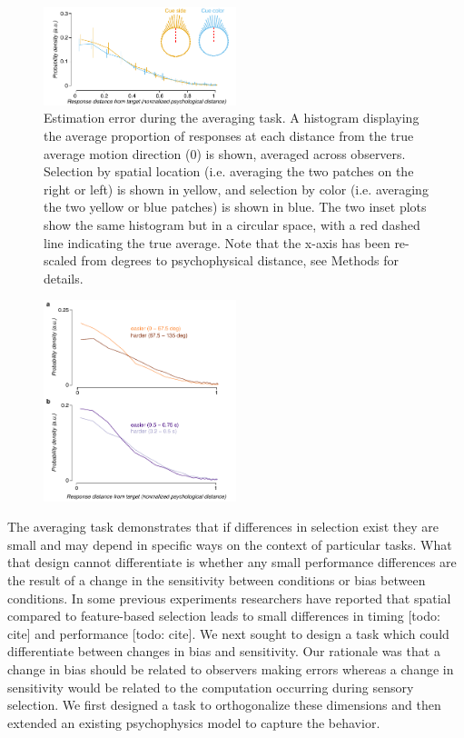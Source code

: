 \begin{figure}
\centering
\includegraphics[keepaspectratio,width=0.5\textwidth]{figs_c4/f2_aca_perf.pdf}
\caption[Estimation error during averaging]{Estimation error during the averaging task. A histogram displaying the average proportion of responses at each distance from the true average motion direction (0) is shown, averaged across observers. Selection by spatial location (i.e. averaging the two patches on the right or left) is shown in yellow, and selection by color (i.e. averaging the two yellow or blue patches) is shown in blue. The two inset plots show the same histogram but in a circular space, with a red dashed line indicating the true average. Note that the x-axis has been re-scaled from degrees to psychophysical distance, see Methods for details.}
\label{fig:c4f2}
\end{figure}

\begin{figure}
\centering
\includegraphics[keepaspectratio,width=0.5\textwidth]{figs_c4/f2_aca_parameters.pdf}
\caption[Behavioral task]{}
\label{fig:c4f3}
\end{figure}

The averaging task demonstrates that if differences in selection exist they are small and may depend in specific ways on the context of particular tasks. What that design cannot differentiate is whether any small performance differences are the result of a change in the sensitivity between conditions or bias between conditions. In some previous experiments researchers have reported that spatial compared to feature-based selection leads to small differences in timing [todo: cite] and performance [todo: cite]. We next sought to design a task which could differentiate between changes in bias and sensitivity. Our rationale was that a change in bias should be related to observers making errors whereas a change in sensitivity would be related to the computation occurring during sensory selection. We first designed a task to orthogonalize these dimensions and then extended an existing psychophysics model to capture the behavior. 

